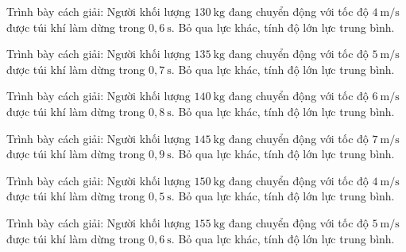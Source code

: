 \begin{bt}
Trình bày cách giải: Người khối lượng $130\ \mathrm{kg}$ đang chuyển động với tốc độ $4\ \mathrm{m/s}$ được túi khí làm dừng trong $0,6\ \mathrm{s}$. Bỏ qua lực khác, tính độ lớn lực trung bình.
\end{bt}

\begin{bt}
Trình bày cách giải: Người khối lượng $135\ \mathrm{kg}$ đang chuyển động với tốc độ $5\ \mathrm{m/s}$ được túi khí làm dừng trong $0,7\ \mathrm{s}$. Bỏ qua lực khác, tính độ lớn lực trung bình.
\end{bt}

\begin{bt}
Trình bày cách giải: Người khối lượng $140\ \mathrm{kg}$ đang chuyển động với tốc độ $6\ \mathrm{m/s}$ được túi khí làm dừng trong $0,8\ \mathrm{s}$. Bỏ qua lực khác, tính độ lớn lực trung bình.
\end{bt}

\begin{bt}
Trình bày cách giải: Người khối lượng $145\ \mathrm{kg}$ đang chuyển động với tốc độ $7\ \mathrm{m/s}$ được túi khí làm dừng trong $0,9\ \mathrm{s}$. Bỏ qua lực khác, tính độ lớn lực trung bình.
\end{bt}

\begin{bt}
Trình bày cách giải: Người khối lượng $150\ \mathrm{kg}$ đang chuyển động với tốc độ $4\ \mathrm{m/s}$ được túi khí làm dừng trong $0,5\ \mathrm{s}$. Bỏ qua lực khác, tính độ lớn lực trung bình.
\end{bt}

\begin{bt}
Trình bày cách giải: Người khối lượng $155\ \mathrm{kg}$ đang chuyển động với tốc độ $5\ \mathrm{m/s}$ được túi khí làm dừng trong $0,6\ \mathrm{s}$. Bỏ qua lực khác, tính độ lớn lực trung bình.
\end{bt}
